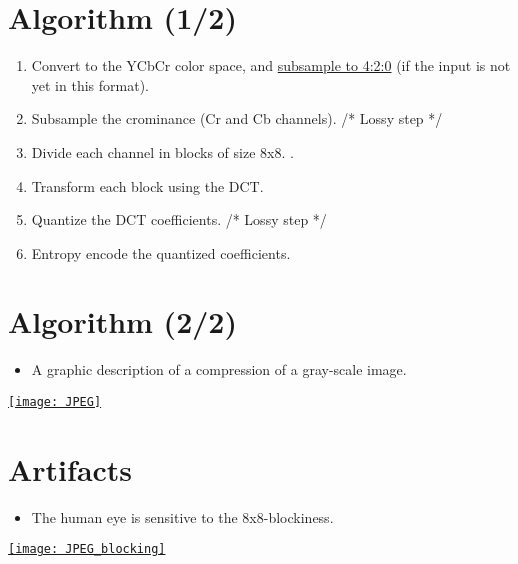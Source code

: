 \section{Algorithm (1/2)}
\begin{enumerate}
\item Convert to the \gls{YCbCr} color space, and
  \href{https://en.wikipedia.org/wiki/Chroma_subsampling}{subsample to
    4:2:0} (if the input is not yet in this format).
\item Subsample the crominance (Cr and Cb channels). /* Lossy step */
\item Divide each channel in blocks of size 8x8. .
\item Transform each block using the \gls{DCT}.
\item Quantize the \gls{DCT} coefficients. /* Lossy step */
\item Entropy encode the quantized coefficients.
\end{enumerate}

\section*{Algorithm (2/2)}
\begin{itemize}
\item A graphic description of a compression of a gray-scale image.
\end{itemize}
\vspace{-2ex}
\begin{center}
  \href{https://link.springer.com/article/10.1007/s40799-019-00358-4}{\texttt{[image: JPEG]}}
\end{center}

\section{Artifacts}
\begin{itemize}
\item The human eye is sensitive to the 8x8-blockiness.
\end{itemize}
\vspace{-2ex}
\begin{center}
  \href{https://thesai.org/Publications/ViewPaper?Volume=6&Issue=4&Code=ijacsa&SerialNo=16}{\texttt{[image: JPEG\_blocking]}}
\end{center}

